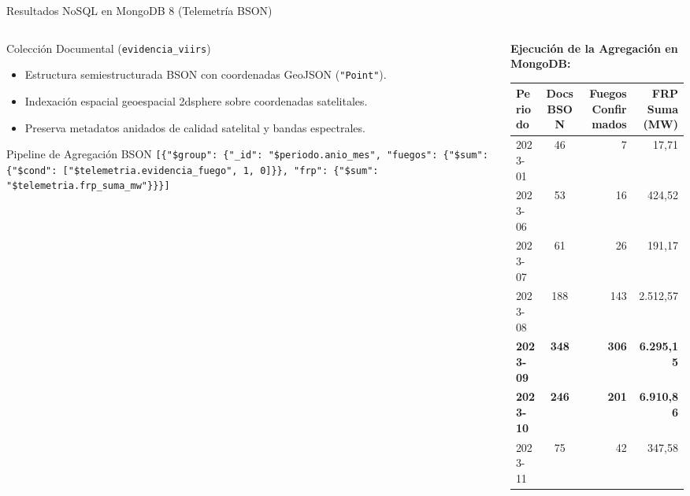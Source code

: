 \documentclass[aspectratio=169,11pt]{beamer}
\newcommand{\seccionactual}{Sustentaci\'on Final}
\begin{document}
\renewcommand{\seccionactual}{MongoDB}
\begin{frame}{Resultados NoSQL en MongoDB 8 (Telemetr\'ia BSON)}
  \begin{columns}
    \begin{column}{0.5\textwidth}
      \begin{block}{Colecci\'on Documental (\texttt{evidencia\_viirs})}\scriptsize
        \begin{itemize}
          \item Estructura semiestructurada BSON con coordenadas GeoJSON (\texttt{"Point"}).
          \item Indexaci\'on espacial geoespacial 2dsphere sobre coordenadas satelitales.
          \item Preserva metadatos anidados de calidad satelital y bandas espectrales.
        \end{itemize}
      \end{block}
      \vspace{0.8cm}
      \begin{exampleblock}{Pipeline de Agregaci\'on BSON}\tiny
        \texttt{[\{"\$group": \{"\_id": "\$periodo.anio\_mes", "fuegos": \{"\$sum": \{"\$cond": ["\$telemetria.evidencia\_fuego", 1, 0]\}\}, "frp": \{"\$sum": "\$telemetria.frp\_suma\_mw"\}\}\}]}
      \end{exampleblock}
    \end{column}
    \begin{column}{0.5\textwidth}
      \scriptsize\textbf{Ejecuci\'on de la Agregaci\'on en MongoDB:}
      \begin{table}[H]
        \centering\tiny
        \begin{tabular}{@{}lcrr@{}}
          \toprule
          \textbf{Periodo} & \textbf{Docs BSON} & \textbf{Fuegos Confirmados} & \textbf{FRP Suma (MW)} \\
          \midrule
          2023-01 & 46  & 7   & 17,71 \\
          2023-06 & 53  & 16  & 424,52 \\
          2023-07 & 61  & 26  & 191,17 \\
          2023-08 & 188 & 143 & 2.512,57 \\
          \rowcolor{FuegoPalido}
          \textbf{2023-09} & \textbf{348} & \textbf{306} & \textbf{6.295,15} \\
          \rowcolor{FuegoPalido}
          \textbf{2023-10} & \textbf{246} & \textbf{201} & \textbf{6.910,86} \\
          2023-11 & 75  & 42  & 347,58 \\
          \bottomrule
        \end{tabular}
      \end{table}
    \end{column}
  \end{columns}
\end{frame}
\end{document}
